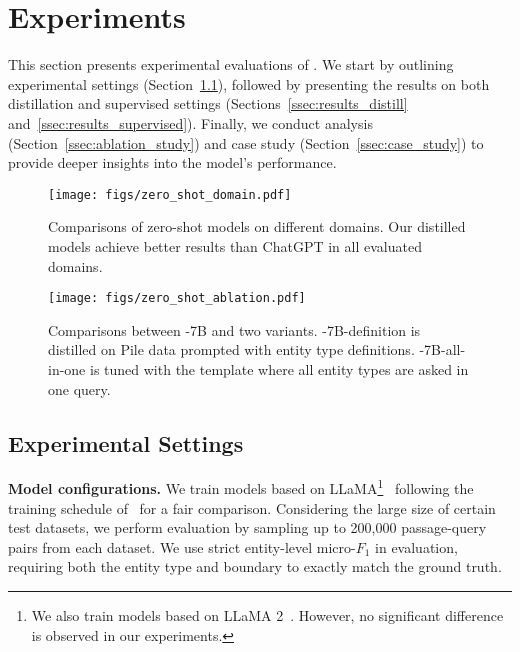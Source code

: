 \section{Experiments}
This section presents experimental evaluations of \longname.
We start by outlining experimental settings (Section~\ref{ssec:experiment_setting}), followed by presenting the results on both distillation and supervised settings (Sections~\ref{ssec:results_distill} and~\ref{ssec:results_supervised}).
Finally, we conduct analysis (Section~\ref{ssec:ablation_study}) and case study (Section~\ref{ssec:case_study}) to provide deeper insights into the model's performance.

\begin{figure*}[t]
\begin{subfigure}[t]{0.46\textwidth}
\centering
\texttt{[image: figs/zero\_shot\_domain.pdf]}
\caption{Comparisons of zero-shot models on different domains. Our distilled models achieve better results than ChatGPT in all evaluated domains.}
\label{fig:self-supervised-bar}
\end{subfigure}
\hfill
\begin{subfigure}[t]{0.46\textwidth}
\centering
\texttt{[image: figs/zero\_shot\_ablation.pdf]}
\caption{Comparisons between \shortname-7B and two variants. \shortname-7B-definition is distilled on Pile data prompted with entity type definitions. \shortname-7B-all-in-one is tuned with the template where all entity types are asked in one query.}
\label{fig:self-supervised-ablation}
\end{subfigure}
\end{figure*}

\subsection{Experimental Settings}
\label{ssec:experiment_setting}
\smallskip
\noindent\textbf{Model configurations.}
We train models based on LLaMA\footnote{We also train models based on LLaMA 2~\citep{touvron2023llama2}. However, no significant difference is observed in our experiments.}~\citep{touvron2023llama} following the training schedule of~\citet{vicuna-2023} for a fair comparison.
Considering the large size of certain test datasets, we perform evaluation by sampling up to 200,000 passage-query pairs from each dataset.
We use strict entity-level micro-$F_1$ in evaluation, requiring both the entity type and boundary to exactly match the ground truth.

